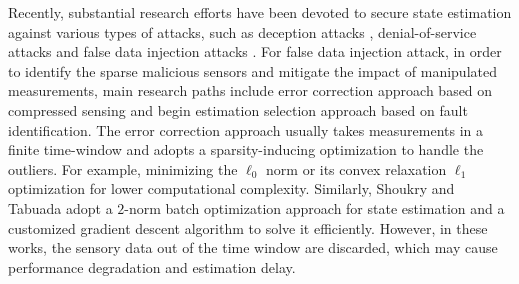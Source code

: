\documentclass[12pt]{article}  %
\begin{document}





Recently, substantial research efforts have been devoted to secure state estimation against various types of attacks, such as deception attacks \cite{mo2016tac},
denial-of-service attacks \cite{yangguanghong2021tac} and false data injection attacks \cite{sandberg_TAC2014}. For false data injection attack, in order to identify the sparse malicious sensors and mitigate the impact of manipulated measurements, main research paths include error correction approach based on compressed sensing and begin estimation selection approach based on fault identification.
The error correction approach usually takes measurements in a finite time-window and adopts a sparsity-inducing optimization to handle the outliers. For example, minimizing the $\ell_0$ norm or its convex relaxation $\ell_1$ optimization for lower computational complexity\cite{FawziTAC2014}. Similarly, Shoukry and Tabuada \cite{ShoukryTAC2016} adopt a $2$-norm batch optimization approach for state estimation and a customized gradient descent algorithm to solve it efficiently.
However, in these works, the sensory data out of the time window are discarded, which may cause performance degradation and estimation delay.
\end{document}
